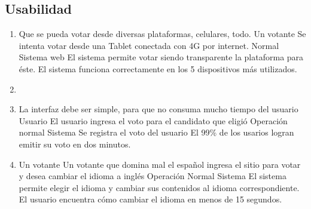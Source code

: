 \subsection{Usabilidad}

\begin{enumerate}

\item \escenario
{Que se pueda votar desde diversas plataformas, celulares, todo.}
{Un votante}
{Se intenta votar desde una Tablet conectada con 4G por internet.}
{Normal}
{Sistema web}
{El sistema permite votar siendo transparente la plataforma para \'este.}
{El sistema funciona correctamente en los 5 dispositivos m\'as utilizados.}


\item  {}

\medskip




\item  \escenario
{La interfaz debe ser simple, para que no consuma mucho tiempo del usuario}
{Usuario}
{El usuario ingresa el voto para el candidato que eligió}
{Operación normal}
{Sistema}
{Se registra el voto del usuario}
{El 99\% de los usarios logran emitir su voto en dos minutos.}
\medskip



\medskip
\item   {}
{Un votante}
{Un votante que domina mal el espa\~nol ingresa el sitio para votar y desea cambiar el idioma a ingl\'es}
{Operación Normal}
{Sistema}
{El sistema permite elegir el idioma y cambiar sus contenidos al idioma correspondiente.}
{El usuario encuentra c\'omo cambiar el idioma en menos de 15 segundos.}
\medskip


\end{enumerate}
